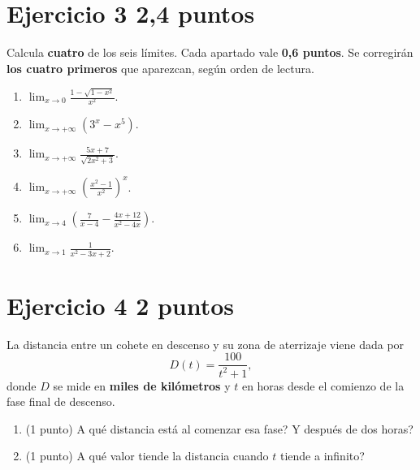 \documentclass[11pt]{article}
\begin{document}
\section*{Ejercicio 3 \hfill 2,4 puntos}
Calcula \textbf{cuatro} de los seis límites. Cada apartado vale \textbf{0,6 puntos}. Se corregirán \textbf{los cuatro primeros} que aparezcan, según orden de lectura.
\begin{enumerate}[label=(\alph*)]
\item $\displaystyle\lim_{x\to0}\frac{1-\sqrt{1-x^2}}{x^2}$.
\item $\displaystyle\lim_{x\to+\infty}(3^x-x^5)$.
\item $\displaystyle\lim_{x\to+\infty}\frac{5x+7}{\sqrt{2x^2+3}}$.
\item $\displaystyle\lim_{x\to+\infty}\left(\frac{x^2-1}{x^2}\right)^x$.
\item $\displaystyle\lim_{x\to4}\left(\frac7{x-4}-\frac{4x+12}{x^2-4x}\right)$.
\item $\displaystyle\lim_{x\to1}\frac1{x^2-3x+2}$.
\end{enumerate}
\section*{Ejercicio 4 \hfill 2 puntos}
La distancia entre un cohete en descenso y su zona de aterrizaje viene dada por
\[D(t)=\frac{100}{t^2+1},\]
donde $D$ se mide en \textbf{miles de kilómetros} y $t$ en horas desde el comienzo de la fase final de descenso.
\begin{enumerate}[label=(\alph*)]
\item (1 punto) \textquestiondown{}A qué distancia está al comenzar esa fase? \textquestiondown{}Y después de dos horas?
\item (1 punto) \textquestiondown{}A qué valor tiende la distancia cuando $t$ tiende a infinito?
\end{enumerate}
\end{document}
